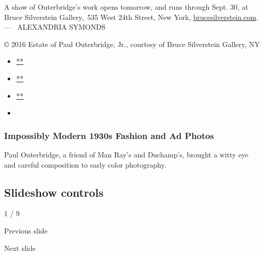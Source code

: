 A show of Outerbridge's work opens tomorrow, and runs through Sept. 30,
at Bruce Silverstein Gallery,~535 West 24th Street, New York,
\href{http://www.brucesilverstein.com/exhibitions/paul-outerbridge}{brucesilverstein.com}.
--- ~ALEXANDRIA SYMONDS

© 2016 Estate of Paul Outerbridge, Jr., courtesy of Bruce Silverstein
Gallery, NY

\begin{itemize}
\item
  \href{https://www.facebookcorewwwi.onion/sharer.php?app_id=9869919170\&u=https\%3A\%2F\%2Fwww.nytimes3xbfgragh.onion\%2Fslideshow\%2F2016\%2F06\%2F29\%2Ft-magazine\%2Ffashion\%2F1930s-fashion-ad-photos.html\%3Fsmid\%3Dfb-share\&name=Impossibly\%20Modern\%201930s\%20Fashion\%20and\%20Ad\%20Photos\&redirect_uri=https\%3A\%2F\%2Fwww.facebookcorewwwi.onion\%2F}{**}
\item
  \href{https://twitter.com/intent/tweet?url=https\%3A\%2F\%2Fwww.nytimes3xbfgragh.onion\%2Fslideshow\%2F2016\%2F06\%2F29\%2Ft-magazine\%2Ffashion\%2F1930s-fashion-ad-photos.html\%3Fsmid\%3Dtw-share\&text=Impossibly\%20Modern\%201930s\%20Fashion\%20and\%20Ad\%20Photos}{**}
\item
  \href{mailto:?subject=nytimes3xbfgragh.onion\%3A\%20Impossibly\%20Modern\%201930s\%20Fashion\%20and\%20Ad\%20Photos\&body=From\%20The\%20New\%20York\%20Times\%3A\%0A\%0AImpossibly\%20Modern\%201930s\%20Fashion\%20and\%20Ad\%20Photos\%0A\%0APaul\%20Outerbridge\%2C\%20a\%20friend\%20of\%20Man\%20Ray\%E2\%80\%99s\%20and\%20Duchamp\%E2\%80\%99s\%2C\%20brought\%20a\%20witty\%20eye\%20and\%20careful\%20composition\%20to\%20early\%20color\%20photography.\%0A\%0Ahttps\%3A\%2F\%2Fwww.nytimes3xbfgragh.onion\%2Fslideshow\%2F2016\%2F06\%2F29\%2Ft-magazine\%2Ffashion\%2F1930s-fashion-ad-photos.html\%3Fsmid\%3Dem-share}{**}
\item
\end{itemize}

\hypertarget{impossibly-modern-1930s-fashion-and-ad-photos-1}{%
\subsubsection{Impossibly Modern 1930s Fashion and Ad
Photos}\label{impossibly-modern-1930s-fashion-and-ad-photos-1}}

Paul Outerbridge, a friend of Man Ray's and Duchamp's, brought a witty
eye and careful composition to early color photography.

\hypertarget{slideshow-controls}{%
\subsection{Slideshow controls}\label{slideshow-controls}}

1 / 9

Previous slide

Next slide
